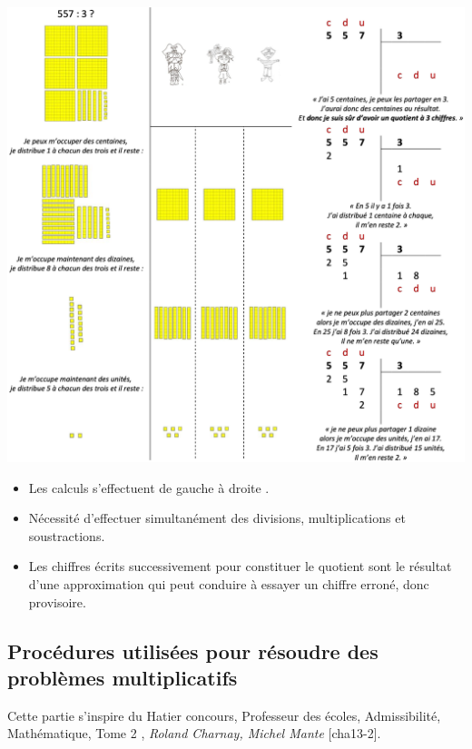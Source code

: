 \includegraphics[width=16.4cm]{Nombres_et_calculs_did/Images/Num3_cours_pirates}

{\renewcommand{\StringDOCUMENTATION}{Difficultés rencontrées par les élèves}
\begin{documentation}
   \begin{itemize}
      \item Les calculs s'effectuent \og de gauche à droite \fg.
      \item Nécessité d'effectuer simultanément des divisions, multiplications et soustractions.
      \item Les chiffres écrits successivement pour constituer le quotient sont le résultat d'une approximation qui peut conduire à essayer un chiffre erroné, donc provisoire. \\ [-8mm]
   \end{itemize}
\end{documentation}}
   

\subsection{Procédures utilisées pour résoudre des problèmes multiplicatifs} %

Cette partie s'inspire du \og Hatier concours, Professeur des écoles, Admissibilité, Mathématique, Tome 2 \fg{}, {\it Roland Charnay, Michel Mante} [cha13-2]. \\

